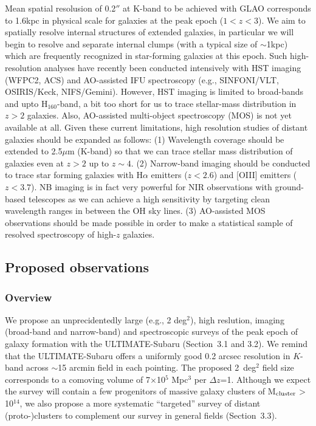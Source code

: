 Mean spatial resolusion of 0.2$''$ at K-band to be achieved with GLAO
corresponds to 1.6kpc in physical scale for galaxies at the peak epoch
($1<z<3$). We aim to spatially resolve internal structures of extended
galaxies, in particular we will begin to resolve and separate internal
clumps (with a typical size of $\sim$1kpc) 
which are frequently recognized in star-forming galaxies at this epoch.
Such high-resolution analyses have recently been conducted intensively
with HST imaging (WFPC2, ACS) and AO-assisted IFU spectroscopy 
(e.g., SINFONI/VLT, OSIRIS/Keck, NIFS/Gemini).
However, HST imaging is limited to broad-bands and upto H$_{160}$-band,
a bit too short for us to trace stellar-mass distribution in $z>2$
galaxies. Also, AO-assisted multi-object spectroscopy (MOS) is not yet
available at all. Given these current limitations, high resolution
studies of distant galaxies should be expanded as follows: 
(1) Wavelength coverage should be extended to 2.5$\mu$m (K-band) so that 
we can trace stellar mass distribution of galaxies even at $z>2$ up to
$z\sim4$. 
(2) Narrow-band imaging should be conducted to trace star forming
galaxies with H$\alpha$ emitters ($z<2.6$) and [OIII] emitters
($z<3.7$). NB imaging is in fact very powerful for NIR observations with
ground-based telescopes as we can achieve a high sensitivity by
targeting clean wavelength ranges in between the OH sky lines.
(3) AO-assisted MOS observations should be made possible in order to make
a statistical sample of resolved spectroscopy of high-$z$ galaxies.

\subsection{Proposed observations}

\subsubsection{Overview}

We propose an unprecidentedly large (e.g., 2 deg$^2$), high reslution, imaging 
(broad-band and narrow-band) and spectroscopic surveys of the peak epoch of galaxy 
formation with the ULTIMATE-Subaru (Section~3.1 and 3.2). We remind that the 
ULTIMATE-Subaru offers a uniformly good 0.2 arcsec resolution in $K$-band across 
$\sim$15 arcmin field in each pointing. The proposed 2~deg$^2$ field size corresponds
to a comoving volume of 7$\times$10$^5$ Mpc$^3$ per $\Delta$$z$=1. 
Although we expect the survey will contain a few progenitors of massive galaxy 
clusters of M$_{\rm cluster}$$>$10$^{14}$\msun, 
we also propose a more systematic ``targeted'' survey of distant
(proto-)clusters to complement our survey in general fields
(Section~3.3).  

